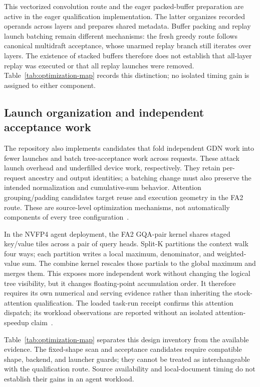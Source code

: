 \documentclass[conference]{IEEEtran}
\begin{document}
This vectorized convolution route and the eager packed-buffer preparation are active in the eager qualification implementation. The latter organizes recorded operands across layers and prepares shared metadata. Buffer packing and replay launch batching remain different mechanisms: the fresh greedy route follows canonical multidraft acceptance, whose unarmed replay branch still iterates over layers. The existence of stacked buffers therefore does not establish that all-layer replay was executed or that all replay launches were removed. Table~\ref{tab:optimization-map} records this distinction; no isolated timing gain is assigned to either component.

\subsection{Launch organization and independent acceptance work}
The repository also implements candidates that fold independent GDN work into fewer launches and batch tree-acceptance work across requests. These attack launch overhead and underfilled device work, respectively. They retain per-request ancestry and output identities; a batching change must also preserve the intended normalization and cumulative-sum behavior. Attention grouping/padding candidates target reuse and execution geometry in the FA2 route. These are source-level optimization mechanisms, not automatically components of every tree configuration~\cite{lumo2026archive}.

In the NVFP4 agent deployment, the FA2 GQA-pair kernel shares staged key/value tiles across a pair of query heads. Split-K partitions the context walk four ways; each partition writes a local maximum, denominator, and weighted-value sum. The combine kernel rescales those partials to the global maximum and merges them. This exposes more independent work without changing the logical tree visibility, but it changes floating-point accumulation order. It therefore requires its own numerical and serving evidence rather than inheriting the stock-attention qualification. The loaded task-run receipt confirms this attention dispatch; its workload observations are reported without an isolated attention-speedup claim~\cite{lumo2026archive}.

Table~\ref{tab:optimization-map} separates this design inventory from the available evidence. The fixed-shape scan and acceptance candidates require compatible shape, backend, and launcher guards; they cannot be treated as interchangeable with the qualification route. Source availability and local-document timing do not establish their gains in an agent workload.
\end{document}
